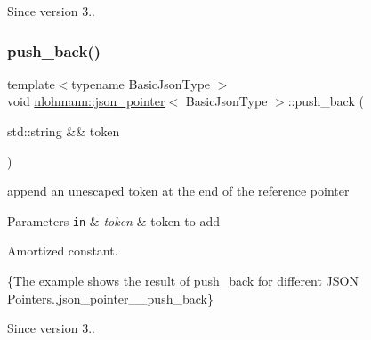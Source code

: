 \begin{DoxySince}{Since}
version 3.. 
\end{DoxySince}
\mbox{\label{classnlohmann_1_1json__pointer_ac228b13596d3c34185da9fe61b570194}} 
\subsubsection{\texorpdfstring{push\+\_\+back()}{push\_back()}\hspace{0.1cm}{\footnotesize\ttfamily [2/2]}}
{\footnotesize\ttfamily template$<$typename Basic\+Json\+Type $>$ \\
void \hyperlink{classnlohmann_1_1json__pointer}{nlohmann\+::json\+\_\+pointer}$<$ Basic\+Json\+Type $>$\+::push\+\_\+back (\begin{DoxyParamCaption}\item[{std\+::string \&\&}]{token }\end{DoxyParamCaption})\hspace{0.3cm}{\ttfamily [inline]}}



append an unescaped token at the end of the reference pointer 


\begin{DoxyParams}[1]{Parameters}
\mbox{\tt in}  & {\em token} & token to add\\
\hline
\end{DoxyParams}
Amortized constant.

\{The example shows the result of {\ttfamily push\+\_\+back} for different J\+S\+ON Pointers.,json\+\_\+pointer\+\_\+\+\_\+push\+\_\+back\}

\begin{DoxySince}{Since}
version 3.. 
\end{DoxySince}
\mbox{\label{classnlohmann_1_1json__pointer_aa7649d30da9fc10b0e20704a27aea2a9}} 
